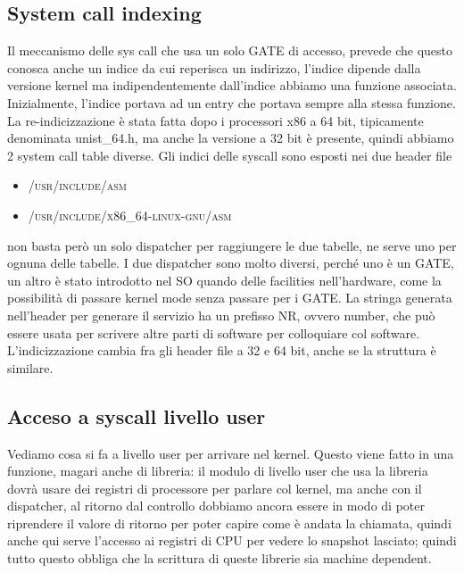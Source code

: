 \documentclass[12pt, oneside]{extbook}
\begin{document}
\subsection{System call indexing}
Il meccanismo delle sys call che usa un solo GATE di accesso, prevede che questo conosca anche un indice da cui reperisca un indirizzo, l'indice dipende dalla versione kernel ma indipendentemente dall'indice abbiamo una funzione associata.\\ Inizialmente, l'indice portava ad un entry che portava sempre alla stessa funzione. La re-indicizzazione è stata fatta dopo i processori x86 a 64 bit, tipicamente denominata \textsf{unist\_64.h}, ma anche la versione a 32 bit è presente, quindi abbiamo 2 system call table diverse. Gli indici delle syscall sono esposti nei due header file
\begin{itemize}
\item \textsc{/usr/include/asm}
\item \textsc{/usr/include/x86\_64-linux-gnu/asm}
\end{itemize}
non basta però un solo dispatcher per raggiungere le due tabelle, ne serve uno per ognuna delle tabelle. I due dispatcher sono molto diversi, perché uno è un GATE, un altro è stato introdotto nel SO quando delle facilities nell'hardware, come la possibilità di passare kernel mode senza passare per i GATE. La stringa generata nell'header per generare il servizio ha un prefisso NR, ovvero number, che può essere usata per scrivere altre parti di software per colloquiare col software. L'indicizzazione cambia fra gli header file a 32 e 64 bit, anche se la struttura è similare.
\subsection{Acceso a syscall livello user}
Vediamo cosa si fa a livello user per arrivare nel kernel. Questo viene fatto in una funzione, magari anche di libreria: il modulo di livello user che usa la libreria dovrà usare dei registri di processore per parlare col kernel, ma anche con il dispatcher, al ritorno dal controllo dobbiamo ancora essere in modo di poter riprendere il valore di ritorno per poter capire come è andata la chiamata, quindi anche qui serve l'accesso ai registri di CPU per vedere lo snapshot lasciato; quindi tutto questo obbliga che la scrittura di queste librerie sia machine dependent.
\end{document}
